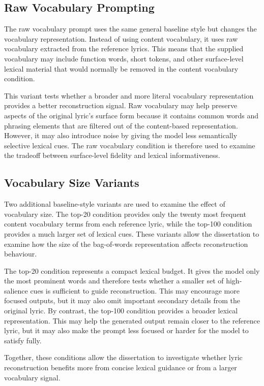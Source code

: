 \subsection{Raw Vocabulary Prompting}

The raw vocabulary prompt uses the same general baseline style but changes the vocabulary representation. Instead of using content vocabulary, it uses raw vocabulary extracted from the reference lyrics. This means that the supplied vocabulary may include function words, short tokens, and other surface-level lexical material that would normally be removed in the content vocabulary condition.

This variant tests whether a broader and more literal vocabulary representation provides a better reconstruction signal. Raw vocabulary may help preserve aspects of the original lyric's surface form because it contains common words and phrasing elements that are filtered out of the content-based representation. However, it may also introduce noise by giving the model less semantically selective lexical cues. The raw vocabulary condition is therefore used to examine the tradeoff between surface-level fidelity and lexical informativeness.

\subsection{Vocabulary Size Variants}

Two additional baseline-style variants are used to examine the effect of vocabulary size. The top-20 condition provides only the twenty most frequent content vocabulary terms from each reference lyric, while the top-100 condition provides a much larger set of lexical cues. These variants allow the dissertation to examine how the size of the bag-of-words representation affects reconstruction behaviour.

The top-20 condition represents a compact lexical budget. It gives the model only the most prominent words and therefore tests whether a smaller set of high-salience cues is sufficient to guide reconstruction. This may encourage more focused outputs, but it may also omit important secondary details from the original lyric. By contrast, the top-100 condition provides a broader lexical representation. This may help the generated output remain closer to the reference lyric, but it may also make the prompt less focused or harder for the model to satisfy fully.

Together, these conditions allow the dissertation to investigate whether lyric reconstruction benefits more from concise lexical guidance or from a larger vocabulary signal.

